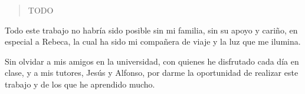 \documentclass[
12pt, %
spanish, %
onehalfspacing, %
parskip, %
headsepline, %
]{MastersDoctoralThesis} %
\begin{document}




\begin{abstract}
\addchaptertocentry{\abstractname} %
TODO
\end{abstract}


\begin{acknowledgements}
\addchaptertocentry{\acknowledgementname} %
Todo este trabajo no habría sido posible sin mi familia, sin su apoyo y cariño, en especial a Rebeca, la cual ha sido mi compañera de viaje y la luz que me ilumina.

Sin olvidar a mis amigos en la universidad, con quienes he disfrutado cada día en clase, y a mis tutores, Jesús y Alfonso, por darme la oportunidad de realizar este trabajo y de los que he aprendido mucho.
\end{acknowledgements}


\tableofcontents %

\listoffigures %

\listoftables %

\end{document}
